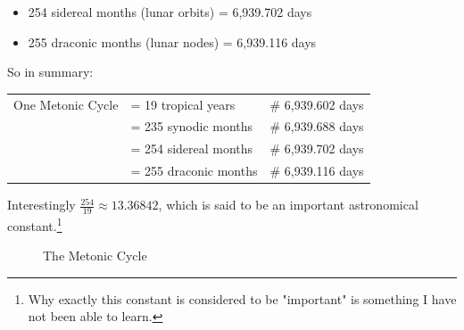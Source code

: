 \documentclass[11pt, oneside]{article}   	%
\theoremstyle{definition}
\begin{document}
\bigskip
\begin{itemize}
  \item 254 sidereal months (lunar orbits) = 6,939.702 days
  \item 255 draconic months (lunar nodes) = 6,939.116 days
\end{itemize}

\bigskip
\noindent
So in  summary: 

\begin{flushleft}
\begin{tabular}{@{}l@{\ }l@{\qquad}l}
  One Metonic Cycle
  & = 19 tropical years&              \# 6,939.602 days \\
  & = 235 synodic months&        \# 6,939.688 days \\
  & = 254 sidereal months&       \# 6,939.702 days \\
  & = 255 draconic months&      \# 6,939.116 days \\
\end{tabular}
\end{flushleft}




\bigskip
\noindent
Interestingly $\frac{254}{19} \approx 13.36842$,  which is said to be an important astronomical constant.\footnote{Why exactly this 
constant is considered to be "important" is something I have not been able to learn.}

\bigskip
\bigskip
\begin{figure}[H]
  \caption{The Metonic Cycle \cite{youtube:freeth2021}}
  \label{fig:metonic_cycle}
\end{figure}
\end{document}

